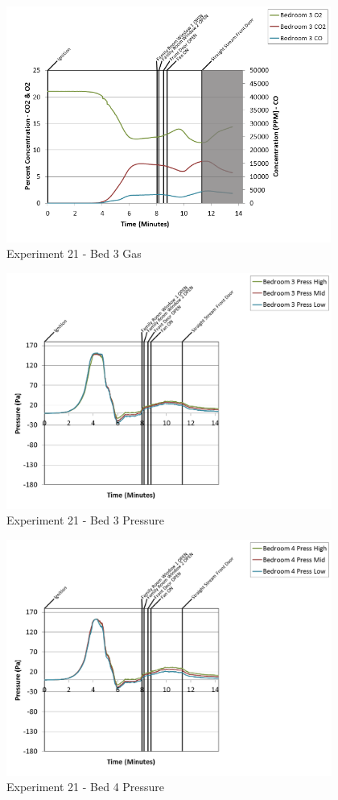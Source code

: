 \documentclass{article}
\begin{document}
\begin{appendices}
\clearpage

\begin{figure}[h!]
	\centering
	\includegraphics[height=3.05in]{0_Images/Results_Charts/Exp_21_Charts/Bed3Gas.png}
	\caption{Experiment 21 - Bed 3 Gas}
\end{figure}


\begin{figure}[h!]
	\centering
	\includegraphics[height=3.05in]{0_Images/Results_Charts/Exp_21_Charts/Bed3Pressure.png}
	\caption{Experiment 21 - Bed 3 Pressure}
\end{figure}

\clearpage

\begin{figure}[h!]
	\centering
	\includegraphics[height=3.05in]{0_Images/Results_Charts/Exp_21_Charts/Bed4Pressure.png}
	\caption{Experiment 21 - Bed 4 Pressure}
\end{figure}



\end{appendices}
\end{document}
